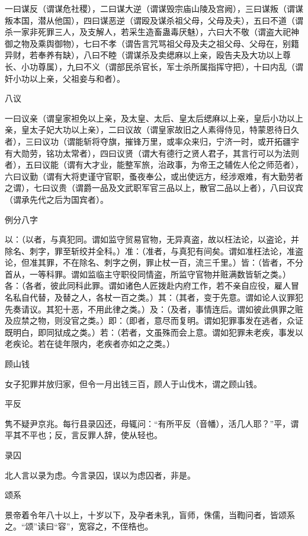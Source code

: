 \documentclass[a4paper,12pt,UTF8,twoside]{ctexbook}
\begin{document}
    一曰谋反（谓谋危社稷），二曰谋大逆（谓谋毁宗庙山陵及宫阙），三曰谋叛（谓谋叛本国，潜从他国），四曰谋恶逆（谓殴及谋杀祖父母，父母及夫），五曰不道（谓杀一家非死罪三人，及支解人，若采生造畜蛊毒厌魅），六曰大不敬（谓盗大祀神御之物及乘舆御物），七曰不孝（谓告言咒骂祖父母及夫之祖父母、父母在，别籍异财，若奉养有缺），八曰不睦（谓谋杀及卖缌麻以上亲，殴告夫及大功以上尊长、小功尊属），九曰不义（谓部民杀官长，军士杀所属指挥守把），十曰内乱（谓奸小功以上亲，父祖妾与和者）。
    
    八议
    
    一曰议亲（谓皇家袒免以上亲，及太皇、太后、皇太后缌麻以上亲，皇后小功以上亲，皇太子妃大功以上亲），二曰议故（谓皇家故旧之人素得侍见，特蒙恩待日久者），三曰议功（谓能斩将夺旗，摧锋万里，或率众来归，宁济一时，或开拓疆宇有大勋劳，铭功太常者），四曰议贤（谓大有德行之贤人君子，其言行可以为法则者），五曰议能（谓有大才业，能整军旅，治政事，为帝王之辅佐人伦之师范者），六曰议勤（谓有大将吏谨守官职，蚤夜奉公，或出使远方，经涉艰难，有大勤劳者之谓），七曰议贵（谓爵一品及文武职军官三品以上，散官二品以上者），八曰议宾（谓承先代之后为国宾者）。
    
    例分八字
    
    以：（以者，与真犯同。谓如监守贸易官物，无异真盗，故以枉法论，以盗论，并除名、刺字，罪至斩绞并全科。）准：（准者，与真犯有间矣。谓如准枉法论，准盗论，但准其罪，不在除名、刺字之例，罪止杖一百，流三千里。）皆：（皆者，不分首从，一等科罪。谓如监临主守职役同情盗，所监守官物并赃满数皆斩之类。）各：（各者，彼此同科此罪。谓如诸色人匠拨赴内府工作，若不亲自应役，雇人冒名私自代替，及替之人，各杖一百之类。）其：（其者，变于先意。谓如论人议罪犯先奏请议。其犯十恶，不用此律之类。）及：（及者，事情连后。谓如彼此俱罪之赃及应禁之物，则没官之类。）即：（即者，意尽而复明。谓如犯罪事发在逃者，众证既明白，即同狱成之类。）若：（若者，文虽殊而会上意。谓如犯罪未老疾，事发以老疾论。若在徒年限内，老疾者亦如之之类。）
    
    顾山钱
    
    女子犯罪并放归家，但令一月出钱三百，顾人于山伐木，谓之顾山钱。
    
    平反
    
    隽不疑尹京兆。每行县录囚还，母辄问：“有所平反（音幡），活几人耶？”平，谓平其不平也；反，言反罪人辞，使从轻也。
    
    录囚
    
    北人言以录为虑。今言录囚，误以为虑囚者，非是。
    
    颂系
    
    景帝着令年八十以上，十岁以下，及孕者未乳，盲师，侏儒，当鞫问者，皆颂系之。“颂”读曰“容”，宽容之，不侄梏也。
    
\end{document}
